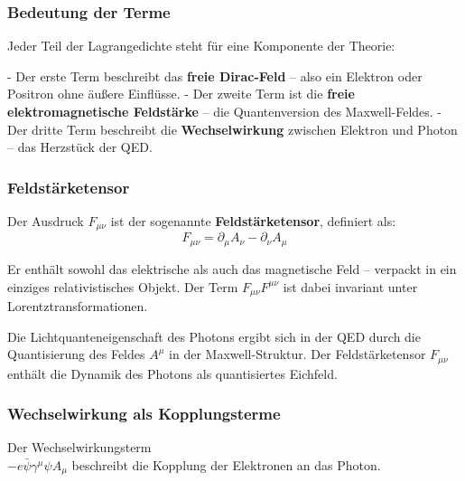 \subsubsection*{Bedeutung der Terme}
Jeder Teil der Lagrangedichte steht für eine Komponente der Theorie:

- Der erste Term beschreibt das \textbf{freie Dirac-Feld} – also ein Elektron oder Positron ohne äußere Einflüsse.
- Der zweite Term ist die \textbf{freie elektromagnetische Feldstärke} – die Quantenversion des Maxwell-Feldes.
- Der dritte Term beschreibt die \textbf{Wechselwirkung} zwischen Elektron und Photon – das Herzstück der QED.

\subsubsection*{Feldstärketensor}
Der Ausdruck $F_{\mu\nu}$ ist der sogenannte \textbf{Feldstärketensor}, definiert als:
\[
F_{\mu\nu} = \partial_\mu A_\nu - \partial_\nu A_\mu
\]

Er enthält sowohl das elektrische als auch das magnetische Feld – verpackt in ein einziges relativistisches Objekt. Der Term $F_{\mu\nu}F^{\mu\nu}$ ist dabei invariant unter Lorentztransformationen.

\medskip
\begin{tcolorbox}[physikbox, title=Photonenfeld aus der Lagrangedichte]
	\label{box:Photonenfeld aus der Lagrangedichte}
	Die Lichtquanteneigenschaft des Photons ergibt sich in der QED durch die Quantisierung des Feldes $A^\mu$ in der Maxwell-Struktur. Der Feldstärketensor $F_{\mu\nu}$ enthält die Dynamik des Photons als quantisiertes Eichfeld.
\end{tcolorbox}

\subsubsection*{Wechselwirkung als Kopplungsterme}
Der Wechselwirkungsterm\\$-e \bar{\psi} \gamma^\mu \psi A_\mu$ beschreibt die Kopplung der Elektronen an das Photon. 

